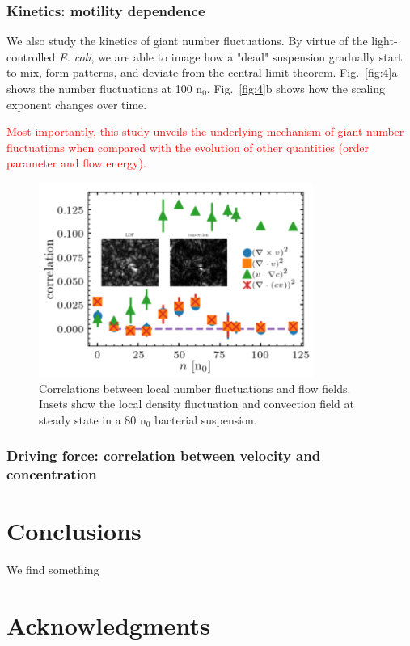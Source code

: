 \documentclass[twocolumn,aps,pre,amsmath,amssymb,floatfix,longbibliography]{revtex4-1}
\begin{document}
\subsubsection{Kinetics: motility dependence}
We also study the kinetics of giant number fluctuations. By virtue of the light-controlled \textit{E. coli}, we are able to image how a "dead" suspension gradually start to mix, form patterns, and deviate from the central limit theorem. Fig.~\ref{fig:4}a shows the number fluctuations at 100 n$_0$. Fig.~\ref{fig:4}b shows how the scaling exponent changes over time.

\textcolor{red}{Most importantly, this study unveils the underlying mechanism of giant number fluctuations when compared with the evolution of other quantities (order parameter and flow energy).}

\begin{figure}[!]
\begin{center}
\includegraphics[width=0.8\textwidth]{GNF_figure-5-v1.png}
\caption[]{Correlations between local number fluctuations and flow fields. Insets show the local density fluctuation and convection field at steady state in a 80 n$_0$ bacterial suspension. }
\label{fig:5}
\end{center}
\end{figure}

\subsubsection{Driving force: correlation between velocity and concentration}
\section{Conclusions}
We find something

\section*{Acknowledgments}


%

\end{document}
